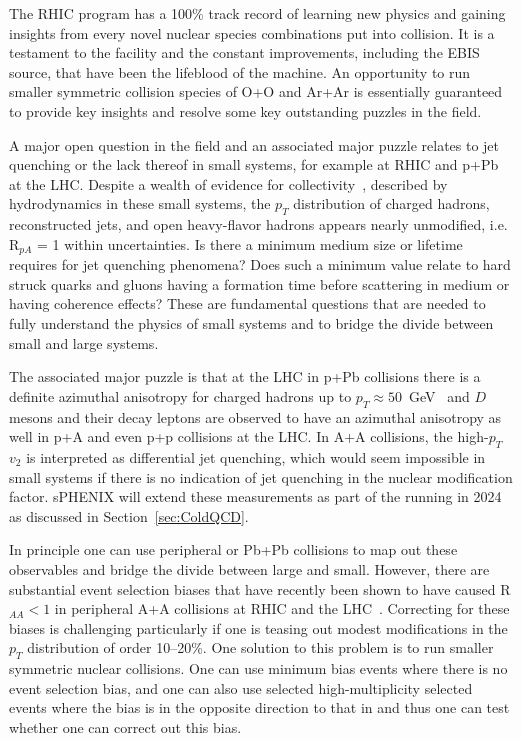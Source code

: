 The RHIC program has a 100\% track record of learning new physics and gaining insights from every novel nuclear species combinations put into collision.    It is a testament to the facility and the constant improvements, including the EBIS source, that have been the lifeblood of the machine.    An opportunity to run smaller symmetric collision species of O+O and Ar+Ar is essentially guaranteed to provide key insights and resolve some key outstanding puzzles in the field.  

A major open question in the field and an associated major puzzle relates to jet quenching or the lack thereof in small systems, for example \pau at RHIC and p+Pb at the LHC.    Despite a wealth of evidence for collectivity~\cite{Nagle:2018nvi}, described by hydrodynamics in these small systems, the $p_{T}$ distribution of charged hadrons, reconstructed jets, and open heavy-flavor hadrons appears nearly unmodified, i.e. R$_{pA}$ = 1 within uncertainties.    Is there a minimum medium size or lifetime requires for jet quenching phenomena?   Does such a minimum value relate to hard struck quarks and gluons having a formation time before scattering in medium or having coherence effects?   These are fundamental questions that are needed to fully understand the physics of small systems and to bridge the divide between small and large systems.    

The associated major puzzle is that at the LHC in p+Pb collisions there is a definite azimuthal anisotropy for charged hadrons up to $p_{T} \approx 50$~GeV~\cite{Aad:2019ajj} and $D$ mesons and their decay leptons are observed to have an azimuthal anisotropy as well in p+A and even p+p collisions at the LHC.   In A+A collisions, the high-$p_T$ $v_{2}$ is interpreted as differential jet quenching, which would seem impossible in small systems if there is no indication of jet quenching in the nuclear modification factor.   sPHENIX will extend these measurements as part of the \pau running in 2024 as discussed in Section~\ref{sec:ColdQCD}.

In principle one can use peripheral \auau or Pb+Pb collisions to map out these observables and bridge the divide between large and small.   However, there are substantial event selection biases that have recently been shown to have caused R$_{AA} < 1$ in peripheral A+A collisions at RHIC and the LHC~\cite{Morsch:2017brb}.    Correcting for these biases is challenging particularly if one is teasing out modest modifications in the $p_{T}$ distribution of order 10--20\%.    One solution to this problem is to run smaller symmetric nuclear collisions.   One can use minimum bias events where there is no event selection bias, and one can also use selected high-multiplicity selected events where the bias is in the opposite direction to that in \auau and thus one can test whether one can correct out this bias.


